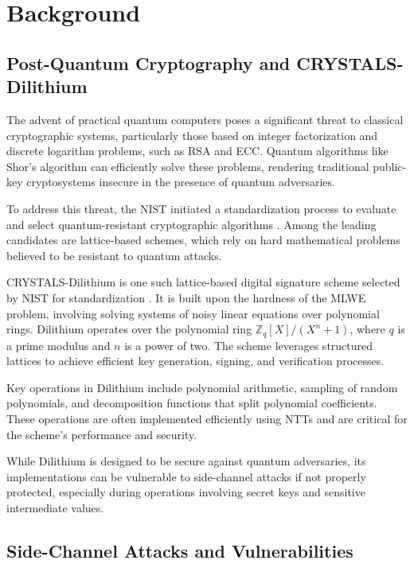 
\chapter{Background}
\thispagestyle{chapterstart}

\section{Post-Quantum Cryptography and CRYSTALS-Dilithium}

The advent of practical quantum computers poses a significant threat to classical cryptographic systems, particularly those based on integer factorization and discrete logarithm problems, such as RSA and \ac{ECC}. Quantum algorithms like Shor's algorithm can efficiently solve these problems, rendering traditional public-key cryptosystems insecure in the presence of quantum adversaries.

To address this threat, the \ac{NIST} initiated a standardization process to evaluate and select quantum-resistant cryptographic algorithms \cite{NIST24}. Among the leading candidates are lattice-based schemes, which rely on hard mathematical problems believed to be resistant to quantum attacks.

CRYSTALS-Dilithium is one such lattice-based digital signature scheme selected by NIST for standardization \cite{NIST24}. It is built upon the hardness of the \ac{MLWE} problem, involving solving systems of noisy linear equations over polynomial rings. Dilithium operates over the polynomial ring $\mathbb{Z}_q[X]/(X^n + 1)$, where $q$ is a prime modulus and $n$ is a power of two. The scheme leverages structured lattices to achieve efficient key generation, signing, and verification processes.

Key operations in Dilithium include polynomial arithmetic, sampling of random polynomials, and decomposition functions that split polynomial coefficients. These operations are often implemented efficiently using \acp{NTT} and are critical for the scheme's performance and security.

While Dilithium is designed to be secure against quantum adversaries, its implementations can be vulnerable to side-channel attacks if not properly protected, especially during operations involving secret keys and sensitive intermediate values.

\section{Side-Channel Attacks and Vulnerabilities}

